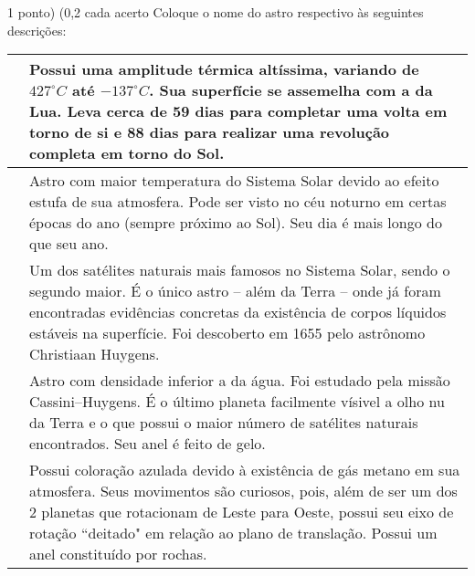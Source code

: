 \documentclass{../lista}
\begin{document}

	\begin{questao}{1 ponto) (0,2 cada acerto}
		Coloque o nome do astro respectivo às seguintes descrições:

		\begin{center} \begin{tabular}{|M{0.2\textwidth}|M{0.65\textwidth}|}
			\hline
			 & Possui uma amplitude térmica altíssima, variando de $427^{\circ}C$ até $-137^{\circ}C$. Sua superfície se assemelha com a da Lua. Leva cerca de 59 dias para completar uma volta em torno de si e 88 dias para realizar uma revolução completa em torno do Sol. \\ \hline
			 & Astro com maior temperatura do Sistema Solar devido ao efeito estufa de sua atmosfera. Pode ser visto no céu noturno em certas épocas do ano (sempre próximo ao Sol). Seu dia é mais longo do que seu ano. \\ \hline
			 & Um dos satélites naturais mais famosos no Sistema Solar, sendo o segundo maior. É o único astro -- além da Terra -- onde já foram encontradas evidências concretas da existência de corpos líquidos estáveis na superfície. Foi descoberto em 1655 pelo astrônomo Christiaan Huygens. \\ \hline
			 & Astro com densidade inferior a da água. Foi estudado pela missão Cassini–Huygens. É o último planeta facilmente vísivel a olho nu da Terra e o que possui o maior número de satélites naturais encontrados. Seu anel é feito de gelo. \\ \hline
			 & Possui coloração azulada devido à existência de gás metano em sua atmosfera. Seus movimentos são curiosos, pois, além de ser um dos 2 planetas que rotacionam de Leste para Oeste, possui seu eixo de rotação ``deitado" em relação ao plano de translação. Possui um anel constituído por rochas.\\ \hline
		\end{tabular} \end{center}
	\end{questao}
\end{document}
